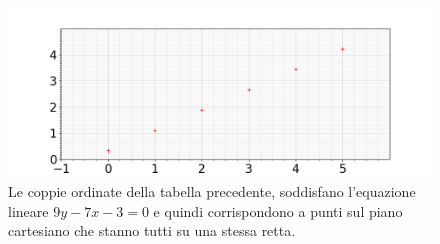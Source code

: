 \begin{figure}[h!]		
	\centering
   	\includegraphics[width=8.0in]{pictures/picture_000.png}
  	\caption{Le coppie ordinate della tabella precedente, soddisfano l'equazione lineare $9y -7x - 3 = 0$ e quindi corrispondono a punti sul piano cartesiano che stanno tutti su una stessa retta. }
   	\label{fig:LibreOfficeCalc000}
\end{figure}
